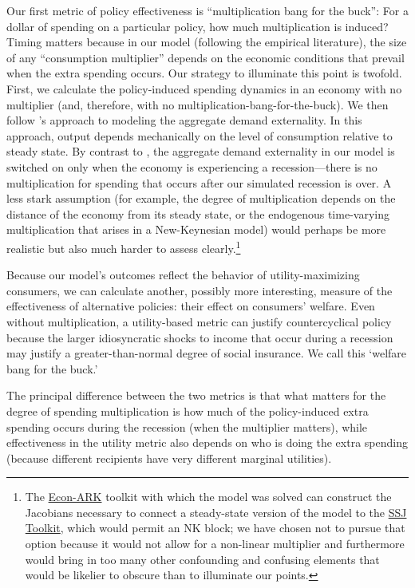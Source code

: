 \documentclass[\econtexRoot/HAFiscal]{subfiles}
\begin{document}
Our first metric of policy effectiveness is ``multiplication bang for the buck'': For a dollar of spending on a particular policy, how much multiplication is induced?  Timing matters because in our model (following the empirical literature), the size of any ``consumption multiplier'' depends on the economic conditions that prevail when the extra spending occurs.  Our strategy to illuminate this point is twofold.  First, we calculate the policy-induced spending dynamics in an economy with no multiplier (and, therefore, with no multiplication-bang-for-the-buck).  We then follow \cite{kmpHandbook2016}'s approach to modeling the aggregate demand externality.  In this approach, output depends mechanically on the level of consumption relative to steady state. By contrast to \cite{kmpHandbook2016}, the aggregate demand externality in our model is switched on only when the economy is experiencing a recession---there is no multiplication for spending that occurs after our simulated recession is over.  A less stark assumption (for example, the degree of multiplication depends on the distance of the economy from its steady state, or the endogenous time-varying multiplication that arises in a New-Keynesian model) would perhaps be more realistic but also much harder to assess clearly.\footnote{The \href{https://econ-ark.org}{Econ-ARK} toolkit with which the model was solved can construct the Jacobians necessary to connect a steady-state version of the model to the \href{https://github.com/shade-econ/sequence-jacobian}{SSJ Toolkit}, which would permit an NK block; we have chosen not to pursue that option because it would not allow for a non-linear multiplier and furthermore would bring in too many other confounding and confusing elements that would be likelier to obscure than to illuminate our points.}

Because our model's outcomes reflect the behavior of utility-maximizing consumers, we can calculate another, possibly more interesting, measure of the effectiveness of alternative policies:  their effect on consumers' welfare.  Even without multiplication, a utility-based metric can justify countercyclical policy because the larger idiosyncratic shocks to income that occur during a recession may justify a greater-than-normal degree of social insurance.  We call this `welfare bang for the buck.'

The principal difference between the two metrics is that what matters for the degree of spending multiplication is how much of the policy-induced extra spending occurs during the recession (when the multiplier matters), while effectiveness in the utility metric also depends on who is doing the extra spending (because different recipients have very different marginal utilities).
\end{document}
